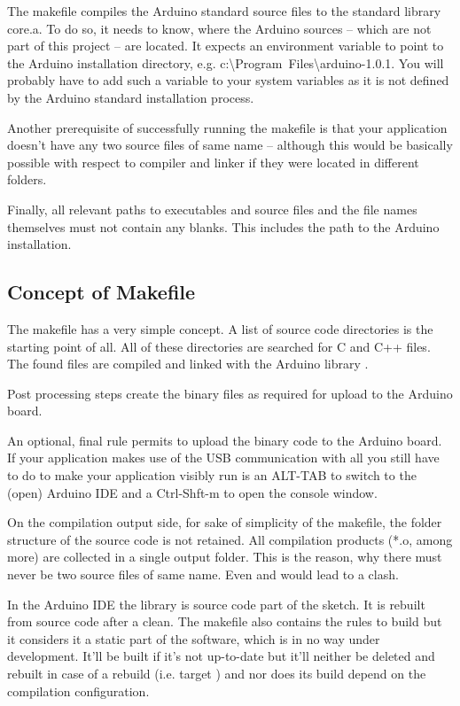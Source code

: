 The makefile compiles the Arduino standard source files to the standard
library core.a. To do so, it needs to know, where the Arduino sources
-- which are not part of this project -- are located. It expects an
environment variable  to point to the Arduino
installation directory, e.g.
c:\textbackslash{}Program~Files\textbackslash\-arduino-1.0.1. You will
probably have to add such a variable to your system variables as it is not
defined by the Arduino standard installation process.

Another prerequisite of successfully running the makefile is that your
application doesn't have any two source files of same name -- although
this would be basically possible with respect to compiler and linker if
they were located in different folders.

Finally, all relevant paths to executables and source files and the file
names themselves must not contain any blanks. This includes the path to
the Arduino installation.

\subsection{Concept of Makefile}

The makefile has a very simple concept. A list of source code directories
is the starting point of all. All of these directories are searched for C
and C++ files. The found files are compiled and linked with the Arduino
library .

Post processing steps create the binary files as required for upload to
the Arduino board.

An optional, final rule permits to upload the binary code to the
Arduino board. If your application makes use of the USB communication with
 all you still have to do to make your application visibly
run is an ALT-TAB to switch to the (open) Arduino IDE and a Ctrl-Shft-m to
open the console window.

On the compilation output side, for sake of simplicity of the makefile,
the folder structure of the source code is not retained. All compilation
products (*.o, among more) are collected in a single output folder. This
is the reason, why there must never be two source files of same name. Even
 and  would lead to a clash.

In the Arduino IDE the library  is source code part of the
sketch. It is rebuilt from source code after a clean. The \rtos{} makefile
also contains the rules to build  but it considers it a
static part of the software, which is in no way under development. It'll
be built if it's not up-to-date but it'll neither be deleted and rebuilt
in case of a rebuild (i.e. target ) and nor does its build
depend on the compilation configuration.

